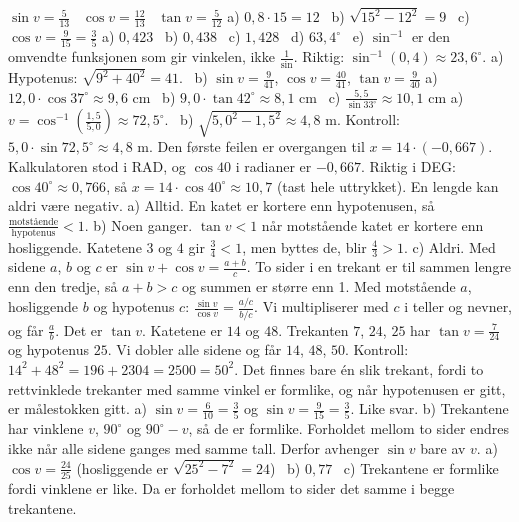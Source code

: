 
 $\sin v = \frac{5}{13}$ \ $\cos v = \frac{12}{13}$ \ $\tan v = \frac{5}{12}$
 a) $0,8 \cdot 15 = 12$ \ b) $\sqrt{15^2 - 12^2} = 9$ \ c) $\cos v = \frac{9}{15} = \frac{3}{5}$
 a) $0,423$ \ b) $0,438$ \ c) $1,428$ \ d) $63,4^\circ$ \ e) $\sin^{-1}$ er den omvendte funksjonen som gir vinkelen, ikke $\frac{1}{\sin}$. Riktig: $\sin^{-1}(0,4) \approx 23,6^\circ$.
 a) Hypotenus: $\sqrt{9^2 + 40^2} = 41$. \ b) $\sin v = \frac{9}{41}$, $\cos v = \frac{40}{41}$, $\tan v = \frac{9}{40}$
 a) $12,0 \cdot \cos 37^\circ \approx 9,6$ cm \ b) $9,0 \cdot \tan 42^\circ \approx 8,1$ cm \ c) $\frac{5,5}{\sin 33^\circ} \approx 10,1$ cm
 a) $v = \cos^{-1}\!\left(\frac{1,5}{5,0}\right) \approx 72,5^\circ$. \ b) $\sqrt{5,0^2 - 1,5^2} \approx 4,8$ m. Kontroll: $5,0 \cdot \sin 72,5^\circ \approx 4,8$ m.
 Den første feilen er overgangen til $x = 14 \cdot (-0,667)$. Kalkulatoren stod i RAD, og $\cos 40$ i radianer er $-0,667$.
Riktig i DEG: $\cos 40^\circ \approx 0,766$, så $x = 14 \cdot \cos 40^\circ \approx 10,7$ (tast hele uttrykket). En lengde kan aldri være negativ.
 a) Alltid. En katet er kortere enn hypotenusen, så $\frac{\text{motstående}}{\text{hypotenus}} < 1$.
b) Noen ganger. $\tan v < 1$ når motstående katet er kortere enn hosliggende. Katetene $3$ og $4$ gir $\frac34 < 1$, men byttes de, blir $\frac43 > 1$.
c) Aldri. Med sidene $a$, $b$ og $c$ er $\sin v + \cos v = \frac{a+b}{c}$. To sider i en trekant er til sammen lengre enn den tredje, så $a + b > c$ og summen er større enn 1.
 Med motstående $a$, hosliggende $b$ og hypotenus $c$: $\frac{\sin v}{\cos v} = \frac{a/c}{b/c}$. Vi multipliserer med $c$ i teller og nevner, og får $\frac{a}{b}$. Det er $\tan v$.
 Katetene er $14$ og $48$. Trekanten $7$, $24$, $25$ har $\tan v = \frac{7}{24}$ og hypotenus $25$. Vi dobler alle sidene og får $14$, $48$, $50$. Kontroll: $14^2 + 48^2 = 196 + 2304 = 2500 = 50^2$.
Det finnes bare én slik trekant, fordi to rettvinklede trekanter med samme vinkel er formlike, og når hypotenusen er gitt, er målestokken gitt.
 a) $\sin v = \frac{6}{10} = \frac35$ og $\sin v = \frac{9}{15} = \frac35$. Like svar.
b) Trekantene har vinklene $v$, $90^\circ$ og $90^\circ - v$, så de er formlike. Forholdet mellom to sider endres ikke når alle sidene ganges med samme tall. Derfor avhenger $\sin v$ bare av $v$.
 a) $\cos v = \frac{24}{25}$ (hosliggende er $\sqrt{25^2 - 7^2} = 24$) \ b) $0,77$ \ c) Trekantene er formlike fordi vinklene er like. Da er forholdet mellom to sider det samme i begge trekantene.


